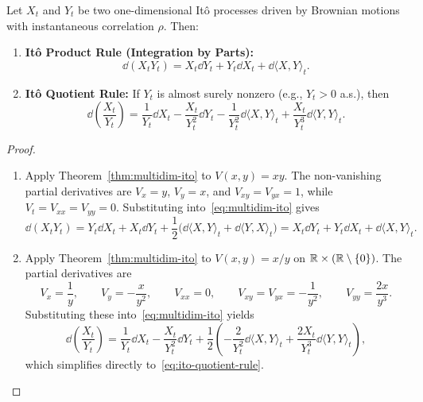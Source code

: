 \begin{corollary}
\label{cor:ito-product-quotient}
Let $X_t$ and $Y_t$ be two one-dimensional It\^o processes driven by Brownian motions with instantaneous correlation $\rho$. Then:
\begin{enumerate}
    \item \textbf{It\^o Product Rule (Integration by Parts):}
    \begin{equation}
    \label{eq:ito-product-rule}
    \dd(X_t Y_t) = X_t \dd Y_t + Y_t \dd X_t + \dd\langle X, Y \rangle_t.
    \end{equation}
    \item \textbf{It\^o Quotient Rule:} If $Y_t$ is almost surely nonzero (e.g., $Y_t > 0$ a.s.), then
    \begin{equation}
    \label{eq:ito-quotient-rule}
    \dd\!\left(\frac{X_t}{Y_t}\right) = \frac{1}{Y_t}\dd X_t - \frac{X_t}{Y_t^2}\dd Y_t - \frac{1}{Y_t^2}\dd\langle X, Y \rangle_t + \frac{X_t}{Y_t^3}\dd\langle Y, Y \rangle_t.
    \end{equation}
\end{enumerate}
\end{corollary}

\begin{proof}
\begin{enumerate}
    \item Apply Theorem~\ref{thm:multidim-ito} to $V(x, y) = xy$. The non-vanishing partial derivatives are $V_x = y$, $V_y = x$, and $V_{xy} = V_{yx} = 1$, while $V_t = V_{xx} = V_{yy} = 0$. Substituting into~\eqref{eq:multidim-ito} gives
    \[
    \dd(X_t Y_t) = Y_t \dd X_t + X_t \dd Y_t + \frac{1}{2}\big(\dd\langle X, Y \rangle_t + \dd\langle Y, X \rangle_t\big) = X_t \dd Y_t + Y_t \dd X_t + \dd\langle X, Y \rangle_t.
    \]
    \item Apply Theorem~\ref{thm:multidim-ito} to $V(x, y) = x/y$ on $\mathbb{R} \times (\mathbb{R} \setminus \{0\})$. The partial derivatives are
    \[
    V_x = \frac{1}{y}, \qquad V_y = -\frac{x}{y^2}, \qquad V_{xx} = 0, \qquad V_{xy} = V_{yx} = -\frac{1}{y^2}, \qquad V_{yy} = \frac{2x}{y^3}.
    \]
    Substituting these into~\eqref{eq:multidim-ito} yields
    \[
    \dd\!\left(\frac{X_t}{Y_t}\right) = \frac{1}{Y_t}\dd X_t - \frac{X_t}{Y_t^2}\dd Y_t + \frac{1}{2}\left(-\frac{2}{Y_t^2}\dd\langle X, Y \rangle_t + \frac{2X_t}{Y_t^3}\dd\langle Y, Y \rangle_t\right),
    \]
    which simplifies directly to~\eqref{eq:ito-quotient-rule}. \qedhere
\end{enumerate}
\end{proof}

